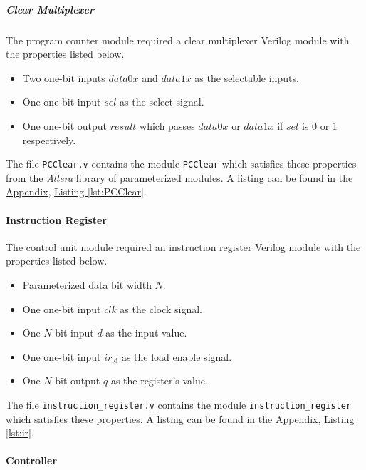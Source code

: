\subparagraph{Clear Multiplexer} \label{subpar:pcclear}

The program counter module required a clear multiplexer Verilog module with the properties listed below.

\begin{itemize}
    \item Two one-bit inputs $data0x$ and $data1x$ as the selectable inputs.
    \item One one-bit input $sel$ as the select signal.
    \item One one-bit output $result$ which passes $data0x$ or $data1x$ if $sel$ is 0 or 1 respectively.
\end{itemize}

The file \verb|PCClear.v| contains the module \verb|PCClear| which satisfies these properties from the \emph{Altera} library of parameterized modules.
A listing can be found in the \hyperref[sec:appendix]{Appendix}, \hyperref[lst:PCClear]{Listing \ref*{lst:PCClear}}.

\paragraph{Instruction Register} \label{par:ir}

The control unit module required an instruction register Verilog module with the properties listed below.

\begin{itemize}
    \item Parameterized data bit width $N$.
    \item One one-bit input $clk$ as the clock signal.
    \item One $N$-bit input $d$ as the input value.
    \item One one-bit input $ir_\text{ld}$ as the load enable signal.
    \item One $N$-bit output $q$ as the register's value.
\end{itemize}

The file \verb|instruction_register.v| contains the module \verb|instruction_register| which satisfies these properties.
A listing can be found in the \hyperref[sec:appendix]{Appendix}, \hyperref[lst:ir]{Listing \ref*{lst:ir}}.

\paragraph{Controller} \label{par:controller}


